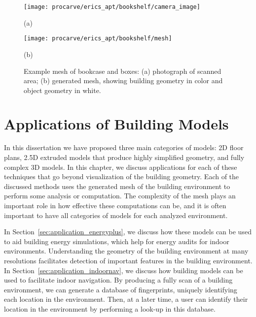 \documentclass[12pt,onecolumn,oneside]{book}
\begin{document}
\begin{figure}[t]

	\centering
	\begin{minipage}[t]{0.65\linewidth} %
		\centerline{\texttt{[image: procarve/erics\_apt/bookshelf/camera\_image]}}
		\centerline{(a)}
	\end{minipage}
	 
	\begin{minipage}[t]{0.65\linewidth} %
		\centerline{\texttt{[image: procarve/erics\_apt/bookshelf/mesh]}}
		\centerline{(b)}
	\end{minipage}
	
	\caption[Example mesh of bookcase and boxes.]{Example mesh of bookcase and boxes: (a) photograph of scanned area; (b) generated mesh, showing building geometry in color and object geometry in white.}
	\label{fig:procarve_bookcase}
\end{figure}



\chapter{Applications of Building Models}
\label{ch:applications}

In this dissertation we have proposed three main categories of models:  2D floor plans, 2.5D extruded models that produce highly simplified geometry, and fully complex 3D models.  In this chapter, we discuss applications for each of these techniques that go beyond visualization of the building geometry.  Each of the discussed methods uses the generated mesh of the building environment to perform some analysis or computation.  The complexity of the mesh plays an important role in how effective these computations can be, and it is often important to have all categories of models for each analyzed environment.

In Section~\ref{sec:application_energyplus}, we discuss how these models can be used to aid building energy simulations, which help for energy audits for indoor environments.  Understanding the geometry of the building environment at many resolutions facilitates detection of important features in the building environment.  In Section~\ref{sec:application_indoornav}, we discuss how building models can be used to facilitate indoor navigation.  By producing a fully scan of a building environment, we can generate a database of fingerprints, uniquely identifying each location in the environment.  Then, at a later time, a user can identify their location in the environment by performing a look-up in this database.
\end{document}
